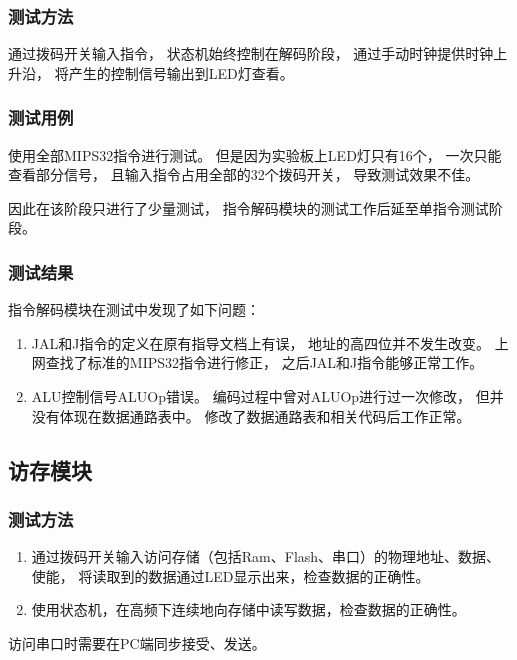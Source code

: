         \subsubsection{测试方法}
            通过拨码开关输入指令，%
            状态机始终控制在解码阶段，%
            通过手动时钟提供时钟上升沿，%
            将产生的控制信号输出到LED灯查看。%

        \subsubsection{测试用例}
            使用全部MIPS32指令进行测试。%
            但是因为实验板上LED灯只有16个，%
            一次只能查看部分信号，%
            且输入指令占用全部的32个拨码开关，%
            导致测试效果不佳。%

            因此在该阶段只进行了少量测试，%
            指令解码模块的测试工作后延至单指令测试阶段。

        \subsubsection{测试结果}
            指令解码模块在测试中发现了如下问题：
            \begin{enumerate}
            \item
                JAL和J指令的定义在原有指导文档上有误，%
                地址的高四位并不发生改变。%
                上网查找了标准的MIPS32指令进行修正，%
                之后JAL和J指令能够正常工作。
            \item
                ALU控制信号ALUOp错误。%
                编码过程中曾对ALUOp进行过一次修改，%
                但并没有体现在数据通路表中。%
                修改了数据通路表和相关代码后工作正常。
            \end{enumerate}

    \subsection{访存模块}
        \subsubsection{测试方法}
            \begin{enumerate}
            \item
            通过拨码开关输入访问存储（包括Ram、Flash、串口）的物理地址、数据、使能，%
            将读取到的数据通过LED显示出来，检查数据的正确性。
            \item
            使用状态机，在高频下连续地向存储中读写数据，检查数据的正确性。
            \end{enumerate}
            访问串口时需要在PC端同步接受、发送。
